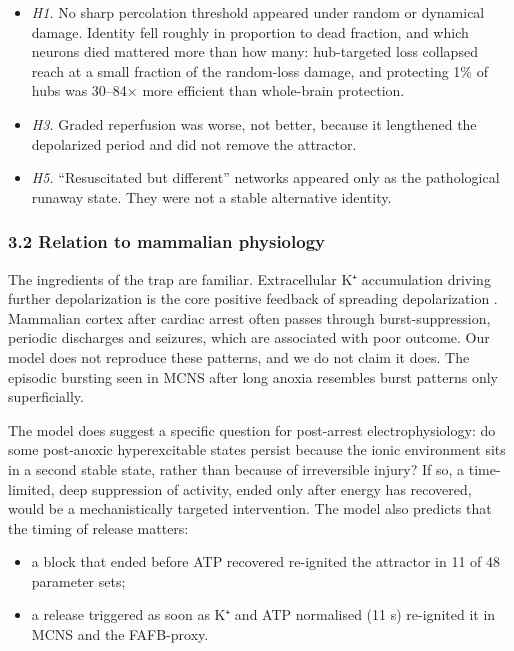 \documentclass[11pt]{article}
\providecommand{\tightlist}{\setlength{\itemsep}{0pt}\setlength{\parskip}{0pt}}
\begin{document}
\begin{itemize}
\tightlist
\item
  \emph{H1.} No sharp percolation threshold appeared under random or dynamical damage. Identity fell roughly in proportion to dead fraction, and which neurons died mattered more than how many: hub-targeted loss collapsed reach at a small fraction of the random-loss damage, and protecting 1\% of hubs was 30--84× more efficient than whole-brain protection.
\item
  \emph{H3.} Graded reperfusion was worse, not better, because it lengthened the depolarized period and did not remove the attractor.
\item
  \emph{H5.} ``Resuscitated but different'' networks appeared only as the pathological runaway state. They were not a stable alternative identity.
\end{itemize}

\subsubsection{3.2 Relation to mammalian physiology}\label{relation-to-mammalian-physiology}

The ingredients of the trap are familiar. Extracellular K⁺ accumulation driving further depolarization is the core positive feedback of spreading depolarization \cite{dreier2011,hartings2016}. Mammalian cortex after cardiac arrest often passes through burst-suppression, periodic discharges and seizures, which are associated with poor outcome. Our model does not reproduce these patterns, and we do not claim it does. The episodic bursting seen in MCNS after long anoxia resembles burst patterns only superficially.

The model does suggest a specific question for post-arrest electrophysiology: do some post-anoxic hyperexcitable states persist because the ionic environment sits in a second stable state, rather than because of irreversible injury? If so, a time-limited, deep suppression of activity, ended only after energy has recovered, would be a mechanistically targeted intervention. The model also predicts that the timing of release matters:

\begin{itemize}
\tightlist
\item
  a block that ended before ATP recovered re-ignited the attractor in 11 of 48 parameter sets;
\item
  a release triggered as soon as K⁺ and ATP normalised (11 s) re-ignited it in MCNS and the FAFB-proxy.
\end{itemize}
\end{document}
